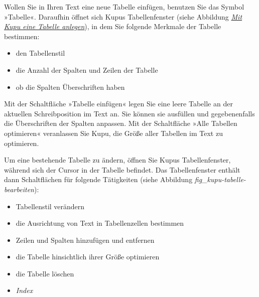 \documentclass[a4paper,12pt,ngerman]{manual}
\begin{document}
Wollen Sie in Ihren Text eine neue Tabelle einfügen, benutzen Sie das Symbol
»Tabelle«. Daraufhin öffnet sich Kupus Tabellenfenster (siehe
Abbildung \hyperlink{fig-kupu-tabelle}{\emph{Mit Kupu eine Tabelle anlegen}}), in dem Sie folgende Merkmale der Tabelle bestimmen:
\begin{itemize}
\item {} 
den Tabellenstil

\item {} 
die Anzahl der Spalten und Zeilen der Tabelle

\item {} 
ob die Spalten Überschriften haben

\end{itemize}

Mit der Schaltfläche »Tabelle einfügen« legen Sie eine leere Tabelle an der
aktuellen Schreibposition im Text an. Sie können sie ausfüllen und
gegebenenfalls die Überschriften der Spalten anpassen. Mit der Schaltfläche
»Alle Tabellen optimieren« veranlassen Sie Kupu, die Größe aller Tabellen im
Text zu optimieren.

Um eine bestehende Tabelle zu ändern, öffnen Sie Kupus Tabellenfenster,
während sich der Cursor in der Tabelle befindet. Das Tabellenfenster enthält
dann Schaltflächen für folgende Tätigkeiten (siehe
Abbildung \emph{fig\_kupu-tabelle-bearbeiten}):
\begin{itemize}
\item {} 
Tabellenstil verändern

\item {} 
die Ausrichtung von Text in Tabellenzellen bestimmen

\item {} 
Zeilen und Spalten hinzufügen und entfernen

\item {} 
die Tabelle hinsichtlich ihrer Größe optimieren

\item {} 
die Tabelle löschen

\end{itemize}
\begin{itemize}
\item {} 
\emph{Index}

\end{itemize}


\renewcommand{\indexname}{Modulindex}
\printmodindex
\renewcommand{\indexname}{Stichwortverzeichnis}
\printindex
\end{document}

